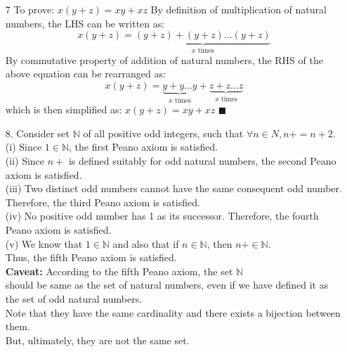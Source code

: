 \documentclass[a4paper,12pt]{article} %
\begin{document}
\begin{enumerate}
\item[7] To prove: \(x(y + z) = xy + xz\)
	By definition of multiplication of natural numbers, the LHS can be written as:
		\[x(y + z) = \underbrace{(y + z) + (y + z) \dots (y + z)}_{x   \text{ times}}\]
	By commutative property of addition of natural numbers, the RHS of the above equation can be rearranged as:
		\[x(y + z) = \underbrace{y + y \dots y}_{x \text{ times}} + \underbrace{z + z \dots z}_{x \text{ times}}\]
	which is then simplified as:
		\(x(y + z) = xy + xz\) $ \blacksquare $

\item[8.] Consider set $\mathbb{N}$ of all positive odd integers, such that $\forall n \in N, n+ = n + 2$.\\
	\subitem(i) Since $1 \in \mathbb{N}$, the first Peano axiom is satisfied.\\

	\subitem(ii) Since $n+$ is defined suitably for odd natural numbers, the second Peano axiom is satisfied.\\

	\subitem(iii) Two distinct odd numbers cannot have the same consequent odd number. Therefore, the third Peano axiom is satisfied.\\

	\subitem(iv) No positive odd number has 1 as its successor. Therefore, the fourth Peano axiom is satisfied.\\

	\subitem(v) We know that \(1 \in \mathbb{N}\) and also that if \(n \in \mathbb{N}\), then \(n+ \in \mathbb{N}\).\\
		Thus, the fifth Peano axiom is satisfied.\\
		\textbf{Caveat:} According to the fifth Peano axiom, the set $\mathbb{N}$\\
		should be same as the set of natural numbers, even if we have defined it as\\
		the set of odd natural numbers.\\
		Note that they have the same cardinality and there exists a bijection between them.\\
		But, ultimately, they are not the same set.
\end{enumerate}
\end{document}
